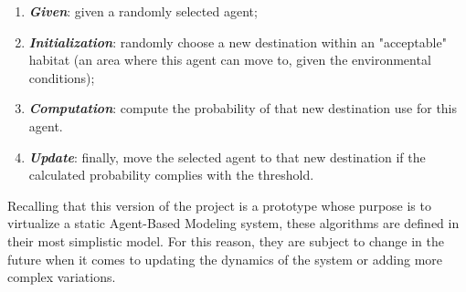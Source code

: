 \begin{enumerate}
    \item \textbf{\textit{Given}}: given a randomly selected agent;
    \item \textbf{\textit{Initialization}}: randomly choose a new destination within an "acceptable" habitat (an area where this agent can move to, given the environmental conditions);
    \item \textbf{\textit{Computation}}: compute the probability of that new destination use for this agent.
    \item \textbf{\textit{Update}}: finally, move the selected agent to that new destination if the calculated probability complies with the threshold.
\end{enumerate}

Recalling that this version of the project is a prototype whose purpose is to virtualize a static Agent-Based Modeling system, these algorithms are defined in their most simplistic model. For this reason, they are subject to change in the future when it comes to updating the dynamics of the system or adding more complex variations.




